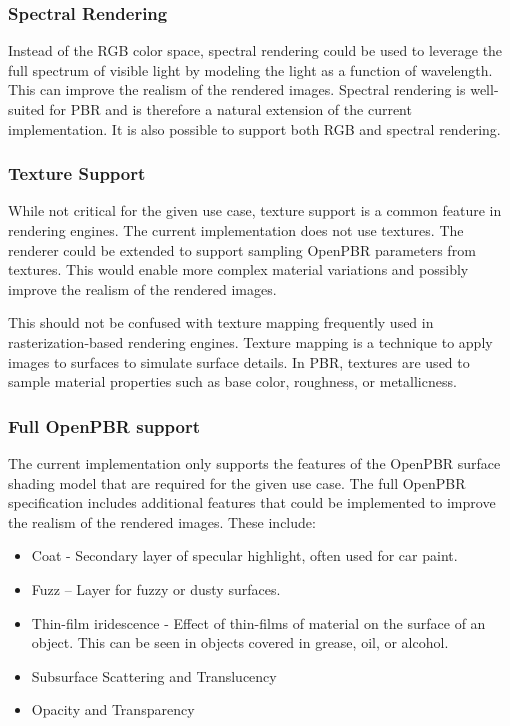 \subsubsection*{Spectral Rendering}

Instead of the \gls{RGB} color space, spectral rendering could be used to leverage the full spectrum of visible light by modeling the light as a function of wavelength. This can improve the realism of the rendered images. Spectral rendering is well-suited for \gls{PBR} and is therefore a natural extension of the current implementation. It is also possible to support both \gls{RGB} and spectral rendering.

\subsubsection*{Texture Support}

While not critical for the given use case, texture support is a common feature in rendering engines. The current implementation does not use textures. The renderer could be extended to support sampling \gls{OpenPBR} parameters from textures. This would enable more complex material variations and possibly improve the realism of the rendered images.

This should not be confused with texture mapping frequently used in rasterization-based rendering engines. Texture mapping is a technique to apply images to surfaces to simulate surface details. In \gls{PBR}, textures are used to sample material properties such as base color, roughness, or metallicness.

\subsubsection*{Full OpenPBR support}

The current implementation only supports the features of the \gls{OpenPBR} surface shading model that are required for the given use case. The full \gls{OpenPBR} specification includes additional features that could be implemented to improve the realism of the rendered images. These include:

\begin{itemize}
  \item{Coat} - Secondary layer of specular highlight, often used for car paint.
  \item{Fuzz} – Layer for fuzzy or dusty surfaces.
  \item{Thin-film iridescence} - Effect of thin-films of material on the surface of an object. This can be seen in objects covered in grease, oil, or alcohol.
  \item{Subsurface Scattering and Translucency}
  \item{Opacity and Transparency}
\end{itemize}

